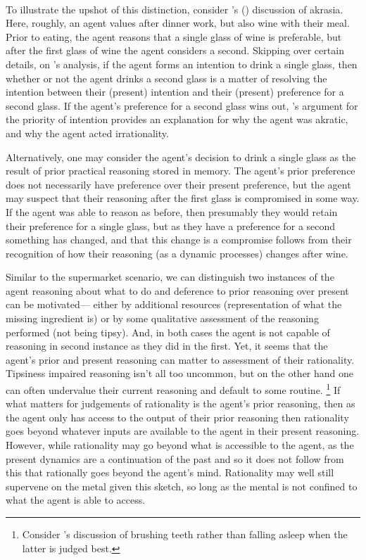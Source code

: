 \documentclass[10pt]{article}
\begin{document}
\paragraph*{ }

To illustrate the upshot of this distinction, consider \citeauthor{Bratman:2007ab}'s (\citeauthor{Bratman:1999ac,Bratman:2007ab}) discussion of akrasia.
Here, roughly, an agent values after dinner work, but also wine with their meal.
Prior to eating, the agent reasons that a single glass of wine is preferable, but after the first glass of wine the agent considers a second.
Skipping over certain details, on \citeauthor{Bratman:2007ab}'s analysis, if the agent forms an intention to drink a single glass, then whether or not the agent drinks a second glass is a matter of resolving the intention between their (present) intention and their (present) preference for a second glass.
If the agent's preference for a second glass wins out, \citeauthor{Bratman:2007ab}'s argument for the priority of intention provides an explanation for why the agent was akratic, and why the agent acted irrationality.

Alternatively, one may consider the agent's decision to drink a single glass as the result of prior practical reasoning stored in memory.
The agent's prior preference does not necessarily have preference over their present preference, but the agent may suspect that their reasoning after the first glass is compromised in some way.
If the agent was able to reason as before, then presumably they would retain their preference for a single glass, but as they have a preference for a second something has changed, and that this change is a compromise follows from their recognition of how their reasoning (as a dynamic processes) changes after wine.

Similar to the supermarket scenario, we can distinguish two instances of the agent reasoning about what to do and deference to prior reasoning over present can be motivated--- either by additional resources (representation of what the missing ingredient is) or by some qualitative assessment of the reasoning performed (not being tipsy).
And, in both cases the agent is not capable of reasoning in second instance as they did in the first.
Yet, it seems that the agent's prior and present reasoning can matter to assessment of their rationality.
Tipsiness impaired reasoning isn't all too uncommon, but on the other hand one can often undervalue their current reasoning and default to some routine.\nolinebreak
\footnote{Consider \citeauthor{Davidson:1969aa}'s discussion of brushing teeth rather than falling asleep when the latter is judged best.}
If what matters for judgements of rationality is the agent's prior reasoning, then as the agent only has access to the output of their prior reasoning then rationality goes beyond whatever inputs are available to the agent in their present reasoning.
However, while rationality may go beyond what is accessible to the agent, as the present dynamics are a continuation of the past and so it does not follow from this that rationally goes beyond the agent's mind.
Rationality may well still supervene on the metal given this sketch, so long as the mental is not confined to what the agent is able to access.

\vfill
\printbibliography
\end{document}
